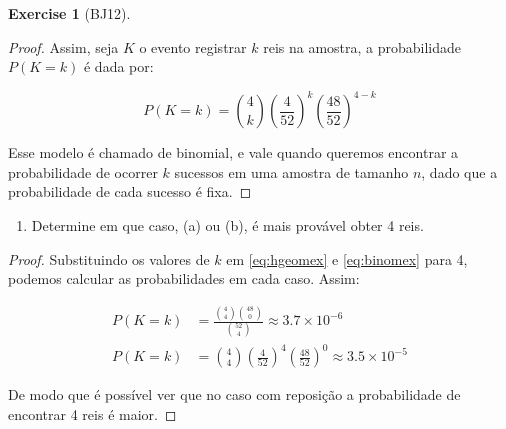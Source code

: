 \documentclass[
]{article}
\providecommand{\tightlist}{%
  \setlength{\itemsep}{0pt}\setlength{\parskip}{0pt}}
\theoremstyle{definition}
\theoremstyle{definition}
\theoremstyle{definition}
\newtheorem{exercise}{Exercise}[section]
\theoremstyle{definition}
\theoremstyle{remark}
\begin{document}
\begin{exercise}[BJ12]
\begin{proof}
Assim, seja \(K\) o evento registrar \(k\) reis na amostra, a probabilidade \(P(K=k)\) é dada por:

\begin{equation}
P(K=k) = \binom{4}{k} \left(\frac{4}{52}\right)^{k} \left(\frac{48}{52}\right)^{4-k}
\label{eq:binomex}
\end{equation}

Esse modelo é chamado de binomial, e vale quando queremos encontrar a probabilidade de ocorrer \(k\) sucessos em uma amostra de tamanho \(n\), dado que a probabilidade de cada sucesso é fixa.
\end{proof}

\begin{enumerate}
\def\labelenumi{\alph{enumi})}
\setcounter{enumi}{2}
\tightlist
\item
  Determine em que caso, (a) ou (b), é mais provável obter 4 reis.
\end{enumerate}

\begin{proof}
Substituindo os valores de \(k\) em \eqref{eq:hgeomex} e \eqref{eq:binomex} para 4, podemos calcular as probabilidades em cada caso. Assim:

\begin{align*}
P(K=k) &= \frac{\binom{4}{4}\binom{48}{0}}{\binom{52}{4}} \approx 3.7 \times 10^{-6} \\
P(K=k) &= \binom{4}{4} \left(\frac{4}{52}\right)^{4} \left(\frac{48}{52}\right)^{0} \approx 3.5 \times 10^{-5}
\end{align*}

De modo que é possível ver que no caso com reposição a probabilidade de encontrar 4 reis é maior.
\end{proof}

\end{exercise}
\end{document}
